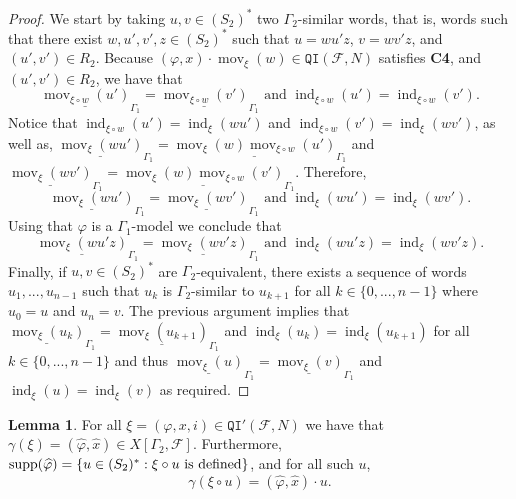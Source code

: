 \documentclass{article}
\theoremstyle{definition}
\newtheorem{lemma}[theorem]{Lemma}
\theoremstyle{definition}
\newcommand{\FF}{\mathcal{F}}
\newcommand{\Fo}{\mathcal{F}}
\newcommand{\QI}{\mathtt{QI}}
\newcommand{\mov}{\operatorname{mov}}
\newcommand{\ind}{\operatorname{ind}}
\newcommand{\supp}{\textnormal{supp}}
\begin{document}
\begin{proof}
    We start by taking $u,v \in (S_2)^*$ two $\Gamma_2$-similar words, that is, words such that there exist $w,u',v',z\in(S_2)^*$ such that $u = wu'z$, $v = wv'z$, and $(u', v')\in R_2$. Because $(\varphi, x)\cdot\mov_{\xi}(w)\in\QI(\Fo,N)$ satisfies \textbf{C4}, and $(u',v')\in R_2$, we have that 
    \[\underline{\mov_{{\xi}\circ w}(u')}_{\Gamma_1} = \underline{\mov_{{\xi}\circ w}(v')}_{\Gamma_1} \mbox{ and } \ind_{{\xi}\circ w}(u') = \ind_{{\xi}\circ w}(v').\]
    Notice that $\ind_{{\xi}\circ w}(u') = \ind_{\xi}(wu')$ and $\ind_{{\xi}\circ w}(v') = \ind_{\xi}(wv')$, as well as, $\underline{\mov_{\xi}(wu')}_{\Gamma_1} = \underline{\mov_{\xi}(w)\mov_{{\xi}\circ w}(u')}_{\Gamma_1}$ and $\underline{\mov_{\xi}(wv')}_{\Gamma_1} = \underline{\mov_{\xi}(w)\mov_{{\xi}\circ w}(v')}_{\Gamma_1}$. Therefore,
    \[\underline{\mov_{\xi}(wu')}_{\Gamma_1} = \underline{\mov_{\xi}(wv')}_{\Gamma_1} \mbox{ and } \ind_{\xi}(wu') = \ind_{\xi}(wv').\]
    Using that $\varphi$ is a $\Gamma_1$-model we conclude that
    \[\underline{\mov_{\xi}(wu'z)}_{\Gamma_1} = \underline{\mov_{\xi}(wv'z)}_{\Gamma_1} \mbox{ and } \ind_{\xi}(wu'z) = \ind_{\xi}(wv'z).\]
    Finally, if $u,v \in (S_2)^*$ are $\Gamma_2$-equivalent, there exists a sequence of words $u_1, ..., u_{n-1}$ such that $u_k$ is $\Gamma_2$-similar to $u_{k+1}$ for all $k\in\{0,...,n-1\}$ where $u_0 = u$ and $u_n = v$. The previous argument implies that $\underline{\mov_{\xi}(u_k)}_{\Gamma_1} = \underline{\mov_{\xi}(u_{k+1})}_{\Gamma_1}$ and ${\ind_{\xi}(u_k)} = {\ind_{\xi}(u_{k+1})}$ for all $k\in\{0,...,n-1\}$ and thus $\underline{\mov_{\xi}(u)}_{\Gamma_1} = \underline{\mov_{\xi}(v)}_{\Gamma_1}$ and $\ind_{\xi}(u) = \ind_{\xi}(v)$ as required.
\end{proof}

\begin{lemma}
\label{lem:propiedades_gamma}
    For all $\xi = (\varphi, x, i)\in\QI'(\Fo,N)$ we have that $\gamma(\xi) = (\widehat{\varphi},\widehat{x}) \in X[\Gamma_2,\FF]$. Furthermore, $\supp(\widehat{\varphi}) = \{ u\in (S_2)^* : \xi \circ u \mbox{ is defined}\}$, and for all such $u$,
    $$\gamma(\xi \circ u) = (\widehat{\varphi},\widehat{x})\cdot u.$$
\end{lemma}
\end{document}
